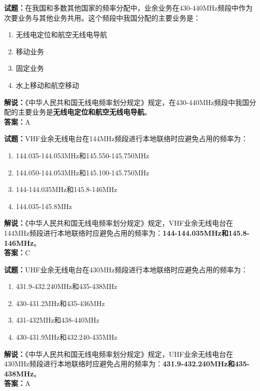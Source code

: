 \documentclass{ctexbook}
\begin{document}
\noindent\textbf{试题：}在我国和多数其他国家的频率分配中，业余业务在430-440\unit{\MHz}频段中作为次要业务与其他业务共用。这个频段中我国分配的主要业务是：
\begin{enumerate}[leftmargin=3em]
  \item 无线电定位和航空无线电导航
  \item 移动业务
  \item 固定业务
  \item 水上移动和航空移动
\end{enumerate}
\noindent\textbf{解说：}《中华人民共和国无线电频率划分规定》规定，在430-440\unit{\MHz}频段中我国分配的主要业务是\textbf{无线电定位和航空无线电导航}。\\\noindent\textbf{答案：}A

\bigskip

\noindent\textbf{试题：}VHF业余无线电台在144\unit{\MHz}频段进行本地联络时应避免占用的频率为：
\begin{enumerate}[leftmargin=3em]
  \item 144.035-144.053\unit{\MHz}和145.550-145.750\unit{\MHz}
  \item 144.050-144.053\unit{\MHz}和145.100-145.750\unit{\MHz}
  \item 144-144.035\unit{\MHz}和145.8-146\unit{\MHz}
  \item 144.035-145.8\unit{\MHz}
\end{enumerate}
\noindent\textbf{解说：}《中华人民共和国无线电频率划分规定》规定，VHF业余无线电台在144\unit{\MHz}频段进行本地联络时应避免占用的频率为：\textbf{144-144.035\unit{\MHz}和145.8-146\unit{\MHz}}。\\\noindent\textbf{答案：}C

\bigskip

\noindent\textbf{试题：}UHF业余无线电台在430\unit{\MHz}频段进行本地联络时应避免占用的频率为：
\begin{enumerate}[leftmargin=3em]
  \item 431.9-432.240\unit{\MHz}和435-438\unit{\MHz}
  \item 430-431.2\unit{\MHz}和435-436\unit{\MHz}
  \item 431-432\unit{\MHz}和438-440\unit{\MHz}
  \item 430-431.9\unit{\MHz}和432.240-435\unit{\MHz}
\end{enumerate}
\noindent\textbf{解说：}《中华人民共和国无线电频率划分规定》规定，UHF业余无线电台在430\unit{\MHz}频段进行本地联络时应避免占用的频率为：\textbf{431.9-432.240\unit{\MHz}和435-438\unit{\MHz}}。\\\noindent\textbf{答案：}A
\end{document}
